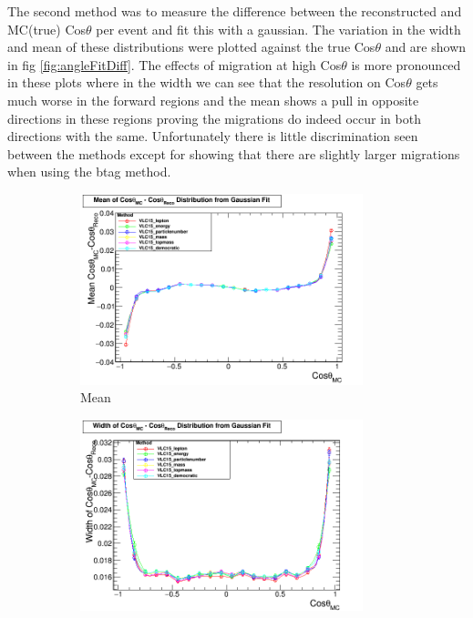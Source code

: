 The second method was to measure the difference between the reconstructed and MC(true) Cos$\theta$ per event and fit this with a gaussian. The variation in the width and mean of these distributions were plotted against the true Cos$\theta$ and are shown in fig \ref{fig:angleFitDiff}. The effects of migration at high Cos$\theta$ is more pronounced in these plots where in the width we can see that the resolution on Cos$\theta$ gets much worse in the forward regions and the mean shows a pull in opposite directions in these regions proving the migrations do indeed occur in both directions with the same. Unfortunately there is little discrimination seen between the methods except for showing that there are slightly larger migrations when using the btag method.

\begin{figure}
  \centering
  \begin{subfigure}{.5\textwidth}
    \centering
    \includegraphics[width=0.9\textwidth]{figures/MeanThetaDiff.png}
    \caption[Mean]{Mean}
  \end{subfigure}%
  \begin{subfigure}{.5\textwidth}
    \centering
    \includegraphics[width=0.9\textwidth]{figures/WidthThetaDiff.png}

\end{subfigure}
\end{figure}
